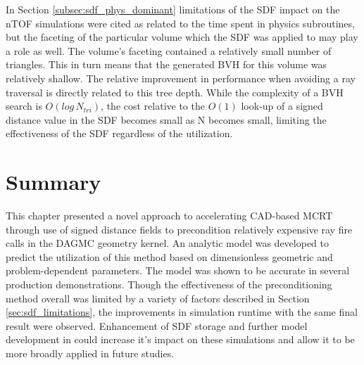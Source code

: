 In Section \ref{subsec:sdf_phys_dominant} limitations of the SDF impact on the
nTOF simulations were cited as related to the time spent in physics subroutines,
but the faceting of the particular volume which the SDF was applied to may play
a role as well. The volume's faceting contained a relatively small number of
triangles. This in turn means that the generated BVH for this volume was
relatively shallow. The relative improvement in performance when avoiding a ray
traversal is directly related to this tree depth. While the complexity of a BVH
search is $O(log\, N_{tri})$, the cost relative to the $O(1)$ look-up of a signed
distance value in the SDF becomes small as N becomes small, limiting the
effectiveness of the SDF regardless of the utilization.

\section{Summary}

This chapter presented a novel approach to accelerating CAD-based MCRT through
use of signed distance fields to precondition relatively expensive ray fire
calls in the DAGMC geometry kernel. An analytic model was developed to predict
the utilization of this method based on dimensionless geometric and
problem-dependent parameters. The model was shown to be accurate in several
production demonstrations. Though the effectiveness of the preconditioning
method overall was limited by a variety of factors described in Section
\ref{sec:sdf_limitations}, the improvements in simulation runtime with the same
final result were observed.  Enhancement of SDF storage and further model
development in could increase it's impact on these simulations and allow it to
be more broadly applied in future studies.
